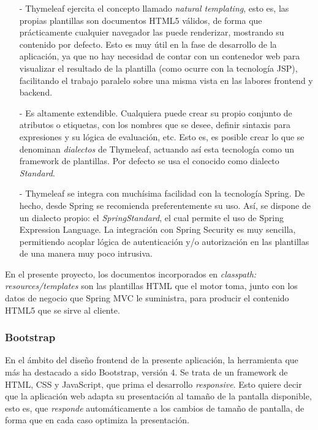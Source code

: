 \documentclass[a4paper]{article}
\begin{document}
    \begin{itemize}
    	\item[-] Thymeleaf ejercita el concepto llamado \emph{natural templating}, esto es, las propias plantillas son documentos HTML5 válidos, de forma que prácticamente cualquier navegador las puede renderizar, mostrando su contenido por defecto. Esto es muy útil en la fase de desarrollo de la aplicación, ya que no hay necesidad de contar con un contenedor web para visualizar el resultado de la plantilla (como ocurre con la tecnología JSP), facilitando el trabajo paralelo sobre una misma vista en las labores frontend y backend.
    	\item[-] Es altamente extendible. Cualquiera puede crear su propio conjunto de atributos o etiquetas, con los nombres que se desee, definir sintaxis para expresiones y su lógica de evaluación, etc. Esto es, es posible crear lo que se denominan \emph{dialectos} de Thymeleaf, actuando así esta tecnología como un framework de plantillas. Por defecto se usa el conocido como dialecto \emph{Standard}.
    	\item[-] Thymeleaf se integra con muchísima facilidad con la tecnología Spring. De hecho, desde Spring se recomienda preferentemente su uso. Así, se dispone de un dialecto propio: el \emph{SpringStandard}, el cual permite el uso de Spring Expression Language. La integración con Spring Security es muy sencilla, permitiendo acoplar lógica de autenticación y/o autorización en las plantillas de una manera muy poco intrusiva.
    \end{itemize}
    
    En el presente proyecto, los documentos incorporados en \emph{classpath: resources/templates} son las plantillas HTML que el motor toma, junto con los datos de negocio que Spring MVC le suministra, para producir el contenido HTML5 que se sirve al cliente.
    
    \subsubsection{Bootstrap}
    En el ámbito del diseño frontend de la presente aplicación, la herramienta que más ha destacado a sido Bootstrap, versión 4. Se trata de un framework de HTML, CSS y JavaScript, que prima el desarrollo \emph{responsive}. Esto quiere decir que la aplicación web adapta su presentación al tamaño de la pantalla disponible, esto es, que \emph{responde} automáticamente a los cambios de tamaño de pantalla, de forma que en cada caso optimiza la presentación.
    
\end{document}
